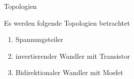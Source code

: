 
\begin{frame}[c]{Topologien} 

  Es werden folgende Topologien betrachtet
  \begin{enumerate}
    \item Spannungsteiler
    \item invertierender Wandler mit Transistor
    \item Bidirektionaler Wandler mit Mosfet
  \end{enumerate}

\end{frame}
